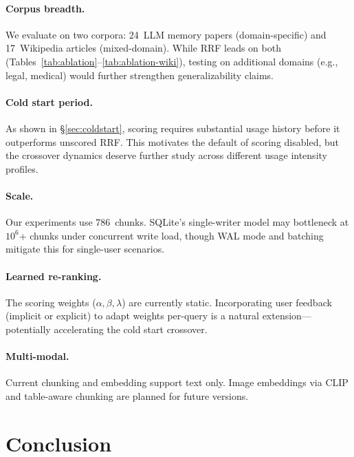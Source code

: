 \documentclass[11pt,a4paper]{article}
\begin{document}
\paragraph{Corpus breadth.}  We evaluate on two corpora: 24~LLM memory
papers (domain-specific) and 17~Wikipedia articles (mixed-domain).
While RRF leads on both (Tables~\ref{tab:ablation}--\ref{tab:ablation-wiki}),
testing on additional domains (e.g., legal, medical) would further
strengthen generalizability claims.

\paragraph{Cold start period.}  As shown in \S\ref{sec:coldstart},
scoring requires substantial usage history before it outperforms
unscored RRF.  This motivates the default of scoring disabled, but
the crossover dynamics deserve further study across different usage
intensity profiles.

\paragraph{Scale.}  Our experiments use 786~chunks.  SQLite's
single-writer model may bottleneck at $10^6$+ chunks under concurrent
write load, though WAL mode and batching mitigate this for
single-user scenarios.

\paragraph{Learned re-ranking.}  The scoring weights ($\alpha, \beta,
\lambda$) are currently static.  Incorporating user feedback (implicit
or explicit) to adapt weights per-query is a natural extension---potentially
accelerating the cold start crossover.

\paragraph{Multi-modal.}  Current chunking and embedding support
text only.  Image embeddings via CLIP and table-aware chunking are
planned for future versions.


\section{Conclusion}
\label{sec:conclusion}
\end{document}
